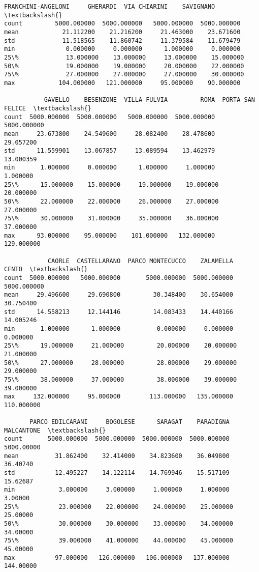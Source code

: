 \documentclass[11pt]{article}
\begin{document}
\begin{tcolorbox}[breakable, size=fbox, boxrule=.5pt, pad at break*=1mm, opacityfill=0]
\begin{Verbatim}[commandchars=\\\{\}]
       FRANCHINI-ANGELONI     GHERARDI  VIA CHIARINI    SAVIGNANO  \textbackslash{}
count         5000.000000  5000.000000   5000.000000  5000.000000
mean            21.112200    21.216200     21.463000    23.671600
std             11.518565    11.860742     11.379584    11.679479
min              0.000000     0.000000      1.000000     0.000000
25\%             13.000000    13.000000     13.000000    15.000000
50\%             19.000000    19.000000     20.000000    22.000000
75\%             27.000000    27.000000     27.000000    30.000000
max            104.000000   121.000000     95.000000    90.000000

           GAVELLO    BESENZONE  VILLA FULVIA         ROMA  PORTA SAN FELICE  \textbackslash{}
count  5000.000000  5000.000000   5000.000000  5000.000000       5000.000000
mean     23.673800    24.549600     28.082400    28.478600         29.057200
std      11.559901    13.067857     13.089594    13.462979         13.000359
min       1.000000     0.000000      1.000000     1.000000          1.000000
25\%      15.000000    15.000000     19.000000    19.000000         20.000000
50\%      22.000000    22.000000     26.000000    27.000000         27.000000
75\%      30.000000    31.000000     35.000000    36.000000         37.000000
max      93.000000    95.000000    101.000000   132.000000        129.000000

            CAORLE  CASTELLARANO  PARCO MONTECUCCO    ZALAMELLA        CENTO  \textbackslash{}
count  5000.000000   5000.000000       5000.000000  5000.000000  5000.000000
mean     29.496600     29.690800         30.348400    30.654000    30.750400
std      14.558213     12.144146         14.083433    14.440166    14.005246
min       1.000000      1.000000          0.000000     0.000000     0.000000
25\%      19.000000     21.000000         20.000000    20.000000    21.000000
50\%      27.000000     28.000000         28.000000    29.000000    29.000000
75\%      38.000000     37.000000         38.000000    39.000000    39.000000
max     132.000000     95.000000        113.000000   135.000000   110.000000

       PARCO EDILCARANI     BOGOLESE      SARAGAT    PARADIGNA  MALCANTONE  \textbackslash{}
count       5000.000000  5000.000000  5000.000000  5000.000000  5000.00000
mean          31.862400    32.414000    34.823600    36.049800    36.40740
std           12.495227    14.122114    14.769946    15.517109    15.62687
min            3.000000     3.000000     1.000000     1.000000     3.00000
25\%           23.000000    22.000000    24.000000    25.000000    25.00000
50\%           30.000000    30.000000    33.000000    34.000000    34.00000
75\%           39.000000    41.000000    44.000000    45.000000    45.00000
max           97.000000   126.000000   106.000000   137.000000   144.00000


\end{Verbatim}
\end{tcolorbox}
\end{document}
